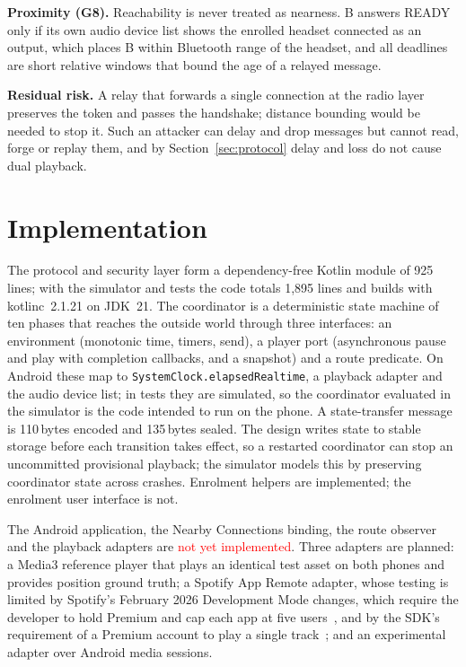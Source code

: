 \documentclass[conference]{IEEEtran}
\newcommand{\draftnote}[1]{\textcolor{red}{#1}}
\begin{document}
\textbf{Proximity (G8).} Reachability is never treated as nearness. B answers READY only if its own audio device list shows the enrolled headset connected as an output, which places B within Bluetooth range of the headset, and all deadlines are short relative windows that bound the age of a relayed message.

\textbf{Residual risk.} A relay that forwards a single connection at the radio layer preserves the token and passes the handshake; distance bounding would be needed to stop it. Such an attacker can delay and drop messages but cannot read, forge or replay them, and by Section~\ref{sec:protocol} delay and loss do not cause dual playback.

\section{Implementation}\label{sec:impl}

The protocol and security layer form a dependency-free Kotlin module of 925 lines; with the simulator and tests the code totals 1{,}895 lines and builds with kotlinc~2.1.21 on JDK~21. The coordinator is a deterministic state machine of ten phases that reaches the outside world through three interfaces: an environment (monotonic time, timers, send), a player port (asynchronous pause and play with completion callbacks, and a snapshot) and a route predicate. On Android these map to \texttt{SystemClock.elapsedRealtime}, a playback adapter and the audio device list; in tests they are simulated, so the coordinator evaluated in the simulator is the code intended to run on the phone. A state-transfer message is 110\,bytes encoded and 135\,bytes sealed. The design writes state to stable storage before each transition takes effect, so a restarted coordinator can stop an uncommitted provisional playback; the simulator models this by preserving coordinator state across crashes. Enrolment helpers are implemented; the enrolment user interface is not.

The Android application, the Nearby Connections binding, the route observer and the playback adapters are \draftnote{not yet implemented}. Three adapters are planned: a Media3 reference player that plays an identical test asset on both phones and provides position ground truth; a Spotify App Remote adapter, whose testing is limited by Spotify's February 2026 Development Mode changes, which require the developer to hold Premium and cap each app at five users~\cite{spotify2026}, and by the SDK's requirement of a Premium account to play a single track~\cite{spotifysdk}; and an experimental adapter over Android media sessions.
\end{document}

